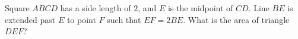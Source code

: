 Square $ABCD$ has a side length of $2$, and $E$ is the midpoint of $CD$. Line $BE$ is extended past $E$ to point $F$ such that $EF = 2BE$. What is the area of triangle $DEF$?
